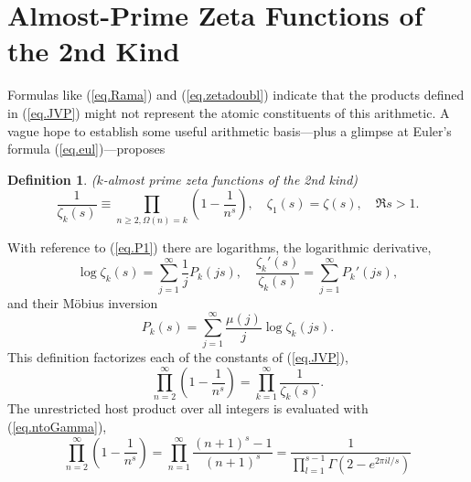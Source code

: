 \documentclass{amsart}
\newtheorem{defn}{Definition}
\begin{document}
\section{Almost-Prime Zeta Functions of the 2nd Kind}
Formulas like (\ref{eq.Rama}) and (\ref{eq.zetadoubl}) indicate that the products defined
in (\ref{eq.JVP}) might not represent the atomic constituents of this arithmetic.
A vague hope to establish some useful arithmetic basis---plus a glimpse
at Euler's formula (\ref{eq.eul})---proposes
\begin{defn}
($k$-almost prime zeta functions of the 2nd kind)
\begin{equation}
\frac{1}{\zeta_k(s)}
\equiv
\prod_{n\ge 2,\Omega(n)=k} \left(1-\frac{1}{n^s}\right)
,
\quad
\zeta_1(s)=\zeta(s)
,
\quad \Re s>1.
\label{eq.zetaksDef}
\end{equation}
\end{defn}
With reference to (\ref{eq.P1}) there are logarithms, the logarithmic derivative,
\begin{equation}
\log \zeta_k(s) = \sum_{j=1}^\infty \frac{1}{j} P_k(js)
,\quad
\frac{ \zeta_k'(s)}{\zeta_k(s)} = \sum_{j=1}^\infty P_k'(js)
,
\end{equation}
and their M\"obius inversion
\begin{equation}
P_k(s) = \sum_{j=1}^\infty \frac{\mu(j)}{j} \log \zeta_k(js)
.
\label{eq.Pksofz2}
\end{equation}
This definition factorizes each of the constants of (\ref{eq.JVP}),
\begin{equation}
\prod_{n=2}^\infty \left(1-\frac{1}{n^s}\right)
=\prod_{k=1}^\infty \frac{1}{\zeta_k(s)}
.
\end{equation}
The unrestricted host product over all integers is evaluated with
(\ref{eq.ntoGamma}),
\begin{equation}
\prod_{n=2}^\infty \left(1-\frac{1}{n^s}\right)
=
\prod_{n=1}^\infty \frac{(n+1)^s-1}{(n+1)^s}
=
\frac{1}{\prod_{l=1}^{s-1}\Gamma(2-e^{2\pi il/s})}
\end{equation}
\end{document}
